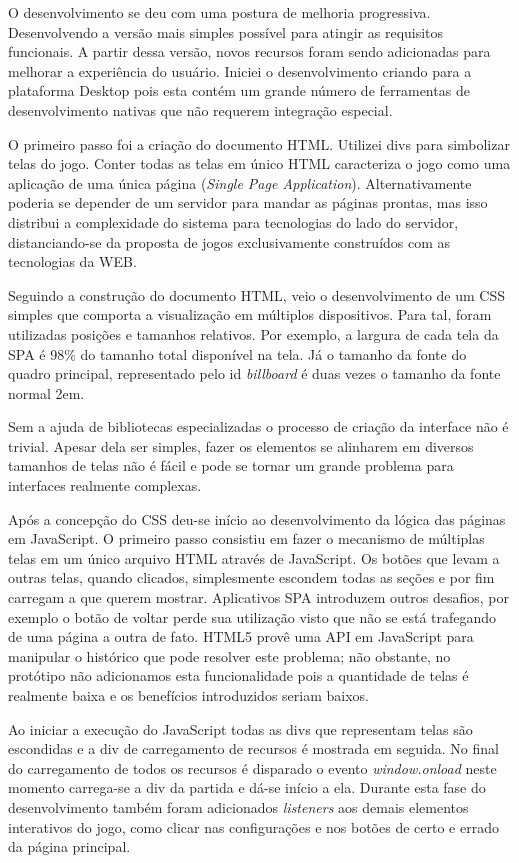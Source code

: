 O desenvolvimento se deu com uma postura de melhoria progressiva.
Desenvolvendo a versão mais simples possível para atingir as
requisitos funcionais. A partir dessa versão, novos recursos foram
sendo adicionadas para melhorar a experiência do usuário. Iniciei o
desenvolvimento criando para a plataforma Desktop pois esta contém
um grande número de ferramentas de desenvolvimento nativas que não
requerem integração especial.

O primeiro passo foi a criação do documento HTML. Utilizei divs
para simbolizar telas do jogo. Conter todas as telas em único
HTML caracteriza o jogo como uma aplicação de uma única página
(\textit{Single Page Application}). Alternativamente poderia se depender
de um servidor para mandar as páginas prontas, mas isso distribui
a complexidade do sistema para tecnologias do lado do servidor,
distanciando-se da proposta de jogos exclusivamente construídos com as
tecnologias da WEB.

Seguindo a construção do documento HTML, veio o desenvolvimento de um
CSS simples que comporta a visualização em múltiplos dispositivos.
Para tal, foram utilizadas posições e tamanhos relativos. Por exemplo,
a largura de cada tela da SPA é 98\% do tamanho total disponível na
tela. Já o tamanho da fonte do quadro principal, representado pelo id
\textit{billboard} é duas vezes o tamanho da fonte normal 2em.

Sem a ajuda de bibliotecas especializadas o processo de criação da
interface não é trivial. Apesar dela ser simples, fazer os
elementos se alinharem em diversos tamanhos de telas não é fácil e
pode se tornar um grande problema para interfaces realmente complexas.

Após a concepção do CSS deu-se início ao desenvolvimento da lógica
das páginas em JavaScript. O primeiro passo consistiu em fazer o
mecanismo de múltiplas telas em um único arquivo HTML através de JavaScript. Os
botões que levam a outras telas, quando clicados, simplesmente escondem
todas as seções e por fim carregam a que querem mostrar. Aplicativos
SPA introduzem outros desafios, por exemplo o botão de voltar
perde sua utilização visto que não se está trafegando de uma página
a outra de fato. HTML5 provê uma API em JavaScript para manipular o histórico
que pode resolver este problema; não obstante, no protótipo não
adicionamos esta funcionalidade pois a quantidade de telas é realmente
baixa e os benefícios introduzidos seriam baixos.

Ao iniciar a execução do JavaScript todas as divs que representam
telas são escondidas e a div de carregamento de recursos é mostrada em
seguida. No final do carregamento de todos os recursos é disparado o
evento \textit{window.onload} neste momento carrega-se a div da partida
e dá-se início a ela. Durante esta fase do desenvolvimento também
foram adicionados \textit{listeners} aos demais elementos interativos do
jogo, como clicar nas configurações e nos botões de certo e errado da
página principal.

